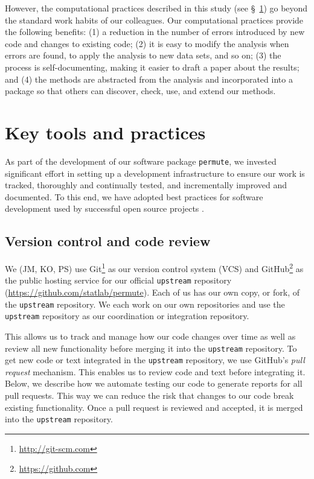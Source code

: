 \documentclass[]{article}
\begin{document}
However, the computational practices described in this study
(see \S~\ref{key-tools}) go beyond the standard work habits of our colleagues.
Our computational practices provide the following benefits:
(1) a reduction in the number of errors introduced by new code and changes to
    existing code;
(2) it is easy to modify the analysis when errors are found, to apply the
    analysis to new data sets, and so on;
(3) the process is self-documenting, making it easier to draft a paper about
    the results; and
(4) the methods are abstracted from the analysis and incorporated into a
    package so that others can discover, check, use, and extend our methods.

\section{Key tools and practices}\label{key-tools}

As part of the development of our software package \texttt{permute}, we
invested significant effort in setting up a development infrastructure to
ensure our work is tracked, thoroughly and continually tested, and
incrementally improved and documented.
To this end, we have adopted best practices for software development used by
successful open source projects \citep{millman2014developing}.

\subsection{\label{sec:vc}Version control and code review}

We (JM, KO, PS) use Git\footnote{\url{http://git-scm.com}} as our version
control system (VCS) and GitHub\footnote{\url{https://github.com}} as the
public hosting service for our official \texttt{upstream} repository
(\url{https://github.com/statlab/permute}).
Each of us has our own copy, or fork, of the \texttt{upstream} repository.
We each work on our own repositories and use the \texttt{upstream} repository
as our coordination or integration repository.

This allows us to track and manage how our code changes over time as well as
review all new functionality before merging it into the \texttt{upstream}
repository.
To get new code or text integrated in the \texttt{upstream} repository, we use
GitHub's \emph{pull request} mechanism.
This enables us to review code and text before integrating it.
Below, we describe how we automate testing our code to generate reports for all
pull requests.
This way we can reduce the risk that changes to our code break existing
functionality.
Once a pull request is reviewed and accepted, it is merged into the
\texttt{upstream} repository.
\end{document}
